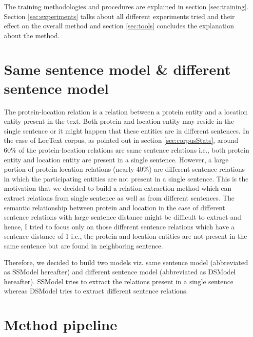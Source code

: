 The training methodologies and procedures are explained in section \ref{sec:training}. Section \ref{sec:experiments} talks about all different experiments tried and their effect on the overall method and section \ref{sec:tools} concludes the explanation about the method.

\section{Same sentence model \& different sentence model}\label{sec:ssModeldsModel}

The protein-location relation is a relation between a protein entity and a location entity present in the text. Both protein and location entity may reside in the single sentence or it might happen that these entities are in different sentences. In the case of LocText corpus, as pointed out in section \ref{sec:corpusStats}, around 60\% of the protein-location relations are same sentence relations i.e., both protein entity and location entity are present in a single sentence. However, a large portion of protein location relations (nearly 40\%) are different sentence relations in which the participating entities are not present in a single sentence. This is the motivation that we decided to build a relation extraction method which can extract relations from single sentence as well as from different sentences. The semantic relationship between protein and location in the case of different sentence relations with large sentence distance might be difficult to extract and hence, I tried to focus only on those different sentence relations which have a sentence distance of 1 i.e., the protein and location entities are not present in the same sentence but are found in neighboring sentence.

Therefore, we decided to build two models viz. same sentence model (abbreviated as SSModel hereafter) and different sentence model (abbreviated as DSModel hereafter). SSModel tries to extract the relations present in a single sentence whereas DSModel tries to extract different sentence relations.

\section{Method pipeline}\label{sec:pipeline}




